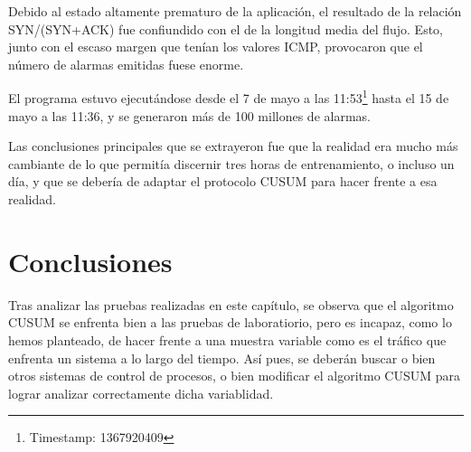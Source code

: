 Debido al estado altamente prematuro de la aplicación, el resultado de la relación SYN/(SYN+ACK) fue confiundido con el 
de la longitud media del flujo. Esto, junto con el escaso margen que tenían los valores ICMP, provocaron que el número 
de alarmas emitidas fuese enorme.

El programa estuvo ejecutándose desde el 7 de mayo a las 11:53\footnote{Timestamp: 1367920409} hasta el 15 de mayo a 
las 11:36, y se generaron más de 100 millones de alarmas.

Las conclusiones principales que se extrayeron fue que la realidad era mucho más cambiante de lo que permitía discernir 
tres horas de entrenamiento, o incluso un día, y que se debería de adaptar el protocolo CUSUM para hacer frente a esa 
realidad.

\section{Conclusiones}
Tras analizar las pruebas realizadas en este capítulo, se observa que el algoritmo CUSUM se enfrenta bien a las pruebas 
de laboratiorio, pero es incapaz, como lo hemos planteado, de hacer frente a una muestra variable como es el tráfico 
que enfrenta un sistema a lo largo del tiempo. Así pues, se deberán buscar o bien otros sistemas de control de 
procesos, o bien modificar el algoritmo CUSUM para lograr analizar correctamente dicha variablidad.


\endinput

